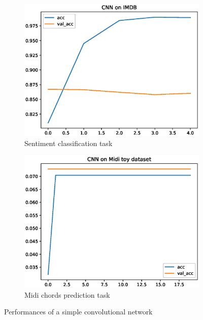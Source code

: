 \documentclass{article}
\begin{document}
\begin{figure}[H]
\centering
\begin{subfigure}{.5\textwidth}
  \centering
  \includegraphics[width =1\linewidth]{ImdbCNN.eps}
  \caption{Sentiment classification task}
  \label{fig:sub1}
\end{subfigure}%
\begin{subfigure}{.5\textwidth}
  \centering
  \includegraphics[width=1\linewidth]{MidiCNN0.eps}
  \caption{Midi chords prediction task}
  \label{fig:sub2}
\end{subfigure}
\caption{Performances of a simple convolutional network}
\label{fig:cnns}
\end{figure}
\end{document}
